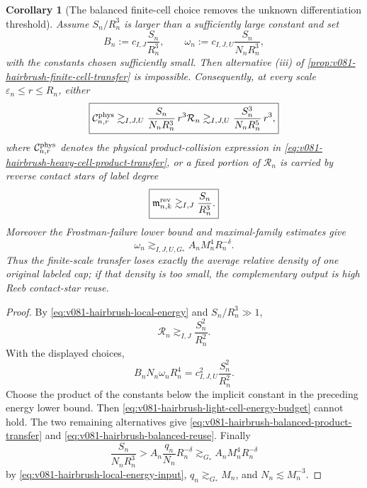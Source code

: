 \documentclass[10pt]{article}
\newtheorem{corollary}[theorem]{Corollary}
\begin{document}
\begin{corollary}[The balanced finite-cell choice removes the unknown differentiation threshold]
\label{cor:v081-hairbrush-balanced-cell-transfer}
Assume \(S_n/R_n^3\) is larger than a sufficiently large constant and set
\[
B_n:=c_{I,J}\frac{S_n}{R_n^3},
\qquad
\omega_n:=c_{I,J,U}\frac{S_n}{N_nR_n^3},
\]
with the constants chosen sufficiently small.  Then alternative \textnormal{(iii)} of
\cref{prop:v081-hairbrush-finite-cell-transfer} is impossible.  Consequently, at every scale
\(\varepsilon_n\le r\le R_n\), either
\begin{equation}
\label{eq:v081-hairbrush-balanced-product-transfer}
\boxed{
\mathcal C^{\rm phys}_{n,r}
\gtrsim_{I,J,U}
\frac{S_n}{N_nR_n^3}\,r^3\mathcal R_n
\gtrsim_{I,J,U}
\frac{S_n^3}{N_nR_n^5}\,r^3,
}
\end{equation}
where \(\mathcal C^{\rm phys}_{n,r}\) denotes the physical product-collision expression in
\eqref{eq:v081-hairbrush-heavy-cell-product-transfer}, or a fixed portion of
\(\mathcal R_n\) is carried by reverse contact stars of label degree
\begin{equation}
\label{eq:v081-hairbrush-balanced-reuse}
\boxed{
\mathfrak m^{\rm rev}_{n,k}
\gtrsim_{I,J}
\frac{S_n}{R_n^3}.
}
\end{equation}
Moreover the Frostman-failure lower bound and maximal-family estimates give
\begin{equation}
\label{eq:v081-hairbrush-average-cell-density}
\boxed{
\omega_n
\gtrsim_{I,J,U,G_*}
A_nM_n^4R_n^{-\delta}.
}
\end{equation}
Thus the finite-scale transfer loses exactly the average relative density of one original labeled
cap; if that density is too small, the complementary output is high Reeb contact-star reuse.
\end{corollary}

\begin{proof}
By \eqref{eq:v081-hairbrush-local-energy} and \(S_n/R_n^3\gg1\),
\[
\mathcal R_n\gtrsim_{I,J}\frac{S_n^2}{R_n^2}.
\]
With the displayed choices,
\[
B_nN_n\omega_nR_n^4
=
c_{I,J,U}^2\frac{S_n^2}{R_n^2}.
\]
Choose the product of the constants below the implicit constant in the preceding energy lower
bound.  Then \eqref{eq:v081-hairbrush-light-cell-energy-budget} cannot hold.  The two remaining
alternatives give \eqref{eq:v081-hairbrush-balanced-product-transfer} and
\eqref{eq:v081-hairbrush-balanced-reuse}.  Finally
\[
\frac{S_n}{N_nR_n^3}
>
A_n\frac{q_n}{N_n}R_n^{-\delta}
\gtrsim_{G_*}
A_nM_n^4R_n^{-\delta}
\]
by \eqref{eq:v081-hairbrush-local-energy-input},
\(q_n\gtrsim_{G_*}M_n\), and \(N_n\lesssim M_n^{-3}\).
\end{proof}
\end{document}
